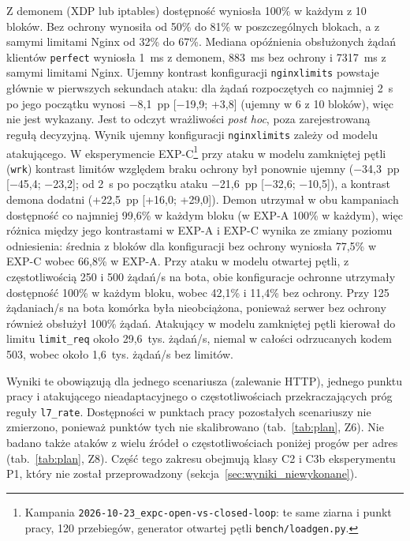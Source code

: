 \documentclass[a4paper,12pt]{article}
\begin{document}
Z demonem (XDP lub iptables) dostępność wyniosła 100\% w każdym z 10 bloków. Bez ochrony wynosiła od 50\% do 81\% w poszczególnych blokach, a z samymi limitami Nginx od 32\% do 67\%. Mediana opóźnienia obsłużonych żądań klientów \texttt{perfect} wyniosła 1~ms z demonem, 883~ms bez ochrony i 7317~ms z samymi limitami Nginx. Ujemny kontrast konfiguracji \texttt{nginxlimits} powstaje głównie w pierwszych sekundach ataku: dla żądań rozpoczętych co najmniej 2~s po jego początku wynosi $-$8,1~pp [$-$19,9; +3,8] (ujemny w 6 z 10 bloków), więc nie jest wykazany. Jest to odczyt wrażliwości \textit{post hoc}, poza zarejestrowaną regułą decyzyjną. Wynik ujemny konfiguracji \texttt{nginxlimits} zależy od modelu atakującego. W eksperymencie EXP-C\footnote{\raggedright Kampania \texttt{2026-10-23\_expc-open-vs-closed-loop}: te same ziarna i punkt pracy, 120 przebiegów, generator otwartej pętli \texttt{bench/loadgen.py}.} przy ataku w modelu zamkniętej pętli (\texttt{wrk}) kontrast limitów względem braku ochrony był ponownie ujemny ($-$34,3~pp [$-$45,4; $-$23,2]; od 2~s po początku ataku $-$21,6~pp [$-$32,6; $-$10,5]), a kontrast demona dodatni (+22,5~pp [+16,0; +29,0]). Demon utrzymał w obu kampaniach dostępność co najmniej 99,6\% w każdym bloku (w EXP-A 100\% w każdym), więc różnica między jego kontrastami w EXP-A i EXP-C wynika ze zmiany poziomu odniesienia: średnia z bloków dla konfiguracji bez ochrony wyniosła 77,5\% w EXP-C wobec 66,8\% w EXP-A. Przy ataku w modelu otwartej pętli, z częstotliwością 250 i 500 żądań/s na bota, obie konfiguracje ochronne utrzymały dostępność 100\% w każdym bloku, wobec 42,1\% i 11,4\% bez ochrony. Przy 125 żądaniach/s na bota komórka była nieobciążona, ponieważ serwer bez ochrony również obsłużył 100\% żądań. Atakujący w modelu zamkniętej pętli kierował do limitu \texttt{limit\_req} około 29,6~tys. żądań/s, niemal w całości odrzucanych kodem 503, wobec około 1,6~tys. żądań/s bez limitów.

Wyniki te obowiązują dla jednego scenariusza (zalewanie HTTP), jednego punktu pracy i atakującego nieadaptacyjnego o częstotliwościach przekraczających próg reguły \texttt{l7\_rate}. Dostępności w punktach pracy pozostałych scenariuszy nie zmierzono, ponieważ punktów tych nie skalibrowano (tab.~\ref{tab:plan}, Z6). Nie badano także ataków z wielu źródeł o częstotliwościach poniżej progów per adres (tab.~\ref{tab:plan}, Z8). Część tego zakresu obejmują klasy C2 i C3b eksperymentu P1, który nie został przeprowadzony (sekcja~\ref{sec:wyniki_niewykonane}).
\end{document}
